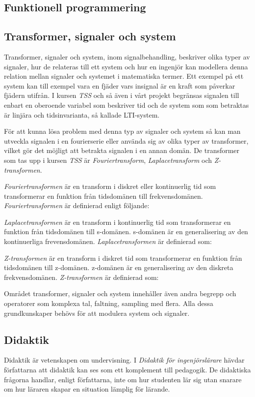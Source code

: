 \documentclass[]{article}
\begin{document}
\subsection{Funktionell programmering}

\subsection{Transformer, signaler och system}
Transformer, signaler och system, inom signalbehandling, beskriver olika typer av signaler, hur de relateras till ett 
system och hur en ingenjör kan modellera denna relation mellan signaler och systemet i matematiska termer. Ett exempel 
på ett system kan till exempel vara en fjäder vars insignal är en kraft som påverkar fjädern utifrån. I kursen 
\textit{TSS} och så även i vårt projekt begränsas signalen till enbart en oberoende variabel som beskriver tid och de 
system som som betraktas är linjära och tidsinvarianta, så kallade  LTI-system.

För att kunna lösa problem med denna typ av signaler och system så kan man utveckla signalen i en fourierserie eller 
använda sig av olika typer av transformer, vilket gör det möjligt att betrakta signalen i en annan domän. De transformer 
som tas upp i kursen \textit{TSS} är \textit{Fouriertransform}, \textit{Laplacetransform} och \textit{Z-transformen}. 


\textit{Fouriertransformen} är en transform i diskret eller kontinuerlig tid som transformerar en funktion från 
tidsdomänen till frekvensdomänen. \textit{Fouriertransformen} är definierad enligt följande:

\textit{Laplacetransformen} är en transform i kontinuerlig tid som transformerar en funktion från tidsdomänen till 
s-domänen. s-domänen är en generalisering av den kontinuerliga frevensdomänen.  \textit{Laplacetransformen} är 
definierad som:
 

\textit{Z-transformen} är en transform i diskret tid som transformerar en funktion från tidsdomänen till z-domänen. 
z-domänen är en generalisering av den diskreta frekvensdomänen. \textit{Z-transformen} är definierad som:

Området transformer, signaler och system innehåller även andra begrepp och operatorer som komplexa tal, faltning, 
sampling med flera.  Alla dessa grundkunskaper behövs för att modulera system och signaler. 

\subsection{Didaktik}
Didaktik är vetenskapen om undervisning.
I \textit{Didaktik för ingenjörslärare} hävdar författarna att
didaktik kan ses som ett komplement till pedagogik.
De didaktiska frågorna handlar, enligt författarna,
inte om hur studenten lär sig utan snarare om hur läraren skapar en
situation lämplig för lärande.
\end{document}
